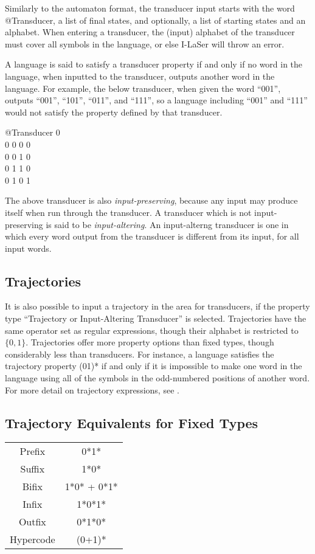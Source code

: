 \documentclass{article}
\begin{document}
Similarly to the automaton format, the transducer input starts with the word @Transducer, a list of final states, and optionally, a list of starting states and an alphabet.
When entering a transducer, the (input) alphabet of the transducer must cover all symbols in the language, or else I-LaSer will throw an error.

A language is said to satisfy a transducer property if and only if no word in the language, when inputted to the transducer, outputs another word in the language.
For example, the below transducer, when given the word ``001'', outputs ``001'', ``101'', ``011'', and ``111'', so a language including ``001'' and ``111'' would not satisfy the property defined by that transducer.
\begin{center}
@Transducer 0\\
0 0 0 0\\
0 0 1 0\\
0 1 1 0\\
0 1 0 1\\
\end{center}
The above transducer is also \textit{input-preserving}, because any input may produce itself when run through the transducer.
A transducer which is not input-preserving is said to be \textit{input-altering}. An input-alterng transducer is one in which every word output from the transducer is different from its input, for all input words.

\subsection{Trajectories}
It is also possible to input a trajectory in the area for transducers, if the property type ``Trajectory or Input-Altering Transducer'' is selected.
Trajectories have the same operator set as regular expressions, %
though their alphabet is restricted to $\{0, 1\}$.
Trajectories offer more property options than fixed types, though considerably less than transducers.
For instance, a language satisfies the trajectory property (01)* if and only if it is impossible to make one word in the language using all of the symbols in the odd-numbered positions of another word.
For more detail on trajectory expressions, see \cite{traj}.

\subsection{Trajectory Equivalents for Fixed Types}
\begin{center}
\begin{tabular}{c c}
Prefix & 0*1*\\
Suffix & 1*0*\\
Bifix & 1*0* + 0*1*\\
Infix & 1*0*1*\\
Outfix & 0*1*0*\\
Hypercode & (0+1)*
\end{tabular}
\end{center}
\end{document}
